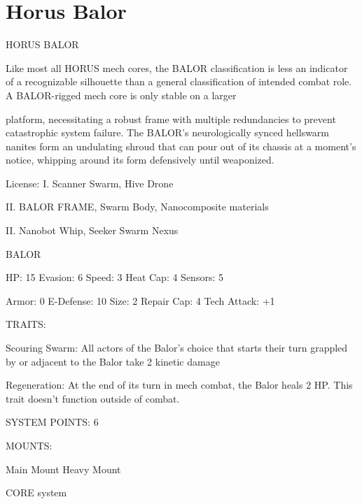\section{Horus Balor}



                                           HORUS BALOR

Like most all HORUS mech cores, the BALOR classification is less an indicator of a recognizable silhouette
than a general classification of intended combat role. A BALOR-rigged mech core is only stable on a larger

platform, necessitating a robust frame with multiple redundancies to prevent catastrophic system failure.
The BALOR’s neurologically synced hellswarm nanites form an undulating shroud that can pour out of its
chassis at a moment’s notice, whipping around its form defensively until weaponized.

                                                  License:
I. Scanner Swarm, Hive Drone

II. BALOR FRAME, Swarm Body, Nanocomposite materials

II. Nanobot Whip, Seeker Swarm Nexus


                                                 BALOR

 HP: 15         Evasion: 6                           Speed: 3           Heat Cap: 4       Sensors: 5

 Armor: 0       E-Defense: 10                        Size: 2            Repair Cap: 4     Tech Attack:
                                                                                          +1

                                                  TRAITS:

 Scouring Swarm: All actors of the Balor’s choice that starts their turn grappled by or adjacent to the
 Balor take 2 kinetic damage

 Regeneration: At the end of its turn in mech combat, the Balor heals 2 HP. This trait doesn’t function
 outside of combat.

                                            SYSTEM POINTS: 6

                                                 MOUNTS:

 Main Mount                                          Heavy Mount

                                               CORE system





